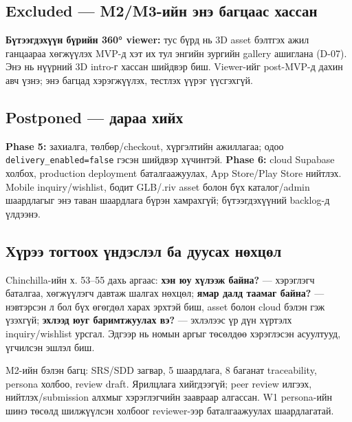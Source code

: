 \documentclass[
  11pt,
  a4paper,
]{article}
\begin{document}
\subsection{Excluded --- M2/M3-ийн энэ багцаас
хассан}\label{doc1-excluded-m2m3-ux438ux439ux43d-ux44dux43dux44d-ux431ux430ux433ux446ux430ux430ux441-ux445ux430ux441ux441ux430ux43d}

\textbf{Бүтээгдэхүүн бүрийн 360° viewer:} тус бүрд нь 3D asset бэлтгэх
ажил ганцаараа хөгжүүлэх MVP-д хэт их тул энгийн зургийн gallery
ашиглана (D-07). Энэ нь нүүрний 3D intro-г хассан шийдвэр биш.
Viewer-ийг post-MVP-д дахин авч үзнэ; энэ багцад хэрэгжүүлэх, тестлэх
үүрэг үүсгэхгүй.

\subsection{Postponed --- дараа
хийх}\label{doc1-postponed-ux434ux430ux440ux430ux430-ux445ux438ux439ux445}

\textbf{Phase 5:} захиалга, төлбөр/checkout, хүргэлтийн ажиллагаа; одоо
\nolinkurl{delivery_enabled=false} гэсэн шийдвэр хүчинтэй. \textbf{Phase
6:} cloud Supabase холбох, production deployment баталгаажуулах, App
Store/Play Store нийтлэх. Mobile inquiry/wishlist, бодит GLB/.riv asset
болон бүх каталог/admin шаардлагыг энэ таван шаардлага бүрэн хамрахгүй;
бүтээгдэхүүний backlog-д үлдээнэ.

\subsection{Хүрээ тогтоох үндэслэл ба дуусах
нөхцөл}\label{doc1-ux445ux4afux440ux44dux44d-ux442ux43eux433ux442ux43eux43eux445-ux4afux43dux434ux44dux441ux43bux44dux43b-ux431ux430-ux434ux443ux443ux441ux430ux445-ux43dux4e9ux445ux446ux4e9ux43b}

Chinchilla-ийн х. 53--55 дахь аргаас: \textbf{хэн юу хүлээж байна?} ---
хэрэглэгч баталгаа, хөгжүүлэгч давтаж шалгах нөхцөл; \textbf{ямар далд
таамаг байна?} --- нэвтэрсэн л бол бүх өгөгдөл харах эрхтэй биш, asset
болон cloud бэлэн гэж үзэхгүй; \textbf{эхлээд юуг баримтжуулах вэ?} ---
эхлэлээс үр дүн хүртэлх inquiry/wishlist урсгал. Эдгээр нь номын аргыг
төсөлдөө хэрэглэсэн асуултууд, үгчилсэн эшлэл биш.

M2-ийн бэлэн багц: SRS/SDD загвар, 5 шаардлага, 8 баганат traceability,
persona холбоо, review draft. Ярилцлага хийгдээгүй; peer review илгээх,
нийтлэх/submission алхмыг хэрэглэгчийн заавраар алгассан. W1 persona-ийн
шинэ төсөлд шилжүүлсэн холбоог reviewer-ээр баталгаажуулах шаардлагатай.
\end{document}
